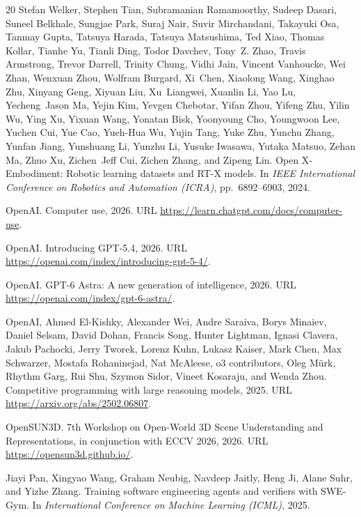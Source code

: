 \documentclass{article}
\begin{document}
\begin{thebibliography}{20}
Stefan Welker, Stephen Tian, Subramanian Ramamoorthy, Sudeep Dasari, Suneel Belkhale, Sungjae Park, Suraj Nair, Suvir Mirchandani, Takayuki Osa, Tanmay Gupta, Tatsuya Harada, Tatsuya Matsushima, Ted Xiao, Thomas Kollar, Tianhe Yu, Tianli Ding, Todor Davchev, Tony~Z. Zhao, Travis Armstrong, Trevor Darrell, Trinity Chung, Vidhi Jain, Vincent Vanhoucke, Wei Zhan, Wenxuan Zhou, Wolfram Burgard, Xi~Chen, Xiaolong Wang, Xinghao Zhu, Xinyang Geng, Xiyuan Liu, Xu~Liangwei, Xuanlin Li, Yao Lu, Yecheng~Jason Ma, Yejin Kim, Yevgen Chebotar, Yifan Zhou, Yifeng Zhu, Yilin Wu, Ying Xu, Yixuan Wang, Yonatan Bisk, Yoonyoung Cho, Youngwoon Lee, Yuchen Cui, Yue Cao, Yueh-Hua Wu, Yujin Tang, Yuke Zhu, Yunchu Zhang, Yunfan Jiang, Yunshuang Li, Yunzhu Li, Yusuke Iwasawa, Yutaka Matsuo, Zehan Ma, Zhuo Xu, Zichen~Jeff Cui, Zichen Zhang, and Zipeng Lin.
\newblock Open X-Embodiment: Robotic learning datasets and RT-X models.
\newblock In \emph{IEEE International Conference on Robotics and Automation (ICRA)}, pp.\ 6892--6903, 2024.

OpenAI.
\newblock Computer use, 2026.
\newblock URL \url{https://learn.chatgpt.com/docs/computer-use}.

OpenAI.
\newblock Introducing GPT-5.4, 2026.
\newblock URL \url{https://openai.com/index/introducing-gpt-5-4/}.

OpenAI.
\newblock GPT-6 Astra: A new generation of intelligence, 2026.
\newblock URL \url{https://openai.com/index/gpt-6-astra/}.

OpenAI, Ahmed El-Kishky, Alexander Wei, Andre Saraiva, Borys Minaiev, Daniel Selsam, David Dohan, Francis Song, Hunter Lightman, Ignasi Clavera, Jakub Pachocki, Jerry Tworek, Lorenz Kuhn, Lukasz Kaiser, Mark Chen, Max Schwarzer, Mostafa Rohaninejad, Nat McAleese, o3 contributors, Oleg M{\"u}rk, Rhythm Garg, Rui Shu, Szymon Sidor, Vineet Kosaraju, and Wenda Zhou.
\newblock Competitive programming with large reasoning models, 2025.
\newblock URL \url{https://arxiv.org/abs/2502.06807}.

OpenSUN3D.
\newblock 7th Workshop on Open-World 3D Scene Understanding and Representations, in conjunction with ECCV 2026, 2026.
\newblock URL \url{https://opensun3d.github.io/}.

Jiayi Pan, Xingyao Wang, Graham Neubig, Navdeep Jaitly, Heng Ji, Alane Suhr, and Yizhe Zhang.
\newblock Training software engineering agents and verifiers with SWE-Gym.
\newblock In \emph{International Conference on Machine Learning (ICML)}, 2025.


\end{thebibliography}
\end{document}
